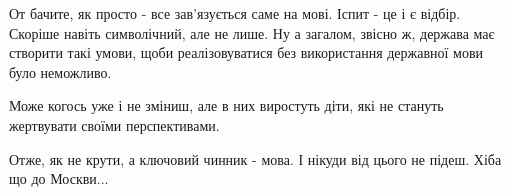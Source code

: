 От бачите, як просто - все зав'язується саме на мові. Іспит - це і є відбір.
Скоріше навіть символічний, але не лише. Ну а загалом, звісно ж, держава має
створити такі умови, щоби реалізовуватися без використання державної мови було
неможливо. 

Може когось уже і не зміниш, але в них виростуть діти, які не стануть
жертвувати своїми перспективами. 

Отже, як не крути, а ключовий чинник - мова. І нікуди від цього не підеш. Хіба
що до Москви...

